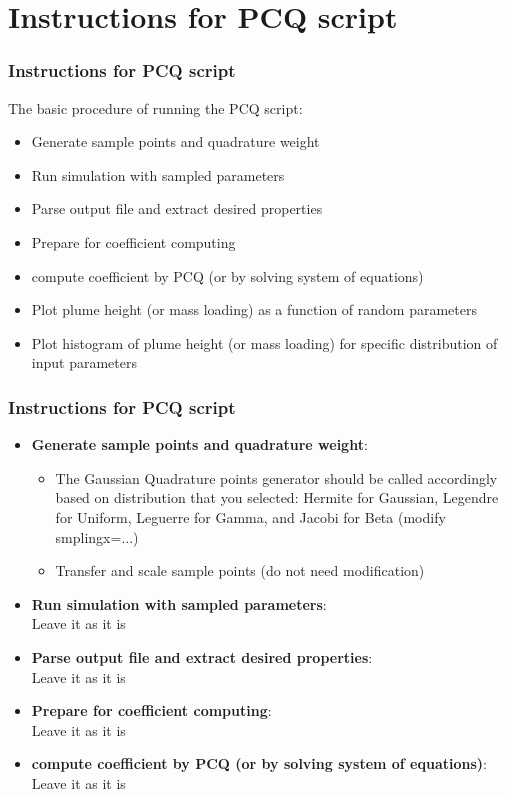 \documentclass[10pt]{beamer}
\begin{document}
\section{Instructions for PCQ script}
\begin{frame}
\frametitle{Instructions for PCQ script}
The basic procedure of running the PCQ script:
 \begin{itemize}
 \item Generate sample points and quadrature weight
 \item Run simulation with sampled parameters
 \item Parse output file and extract desired properties
 \item Prepare for coefficient computing
 \item compute coefficient by PCQ (or by solving system of equations)
 \item Plot plume height (or mass loading) as a function of random parameters
 \item Plot histogram of plume height (or mass loading) for specific distribution of input parameters
 \end{itemize}
\end{frame}
\begin{frame}
\frametitle{Instructions for PCQ script}
\begin{itemize}  
 \item {\bf Generate sample points and quadrature weight}:\\
   \begin{itemize}
    \item The Gaussian Quadrature points generator should be called accordingly based on distribution that you selected:
    Hermite for Gaussian, Legendre for Uniform, Leguerre for Gamma, and Jacobi for Beta (modify smplingx=...)
    \item Transfer and scale sample points (do not need modification)
    \end{itemize}
 \item {\bf Run simulation with sampled parameters}:\\
 Leave it as it is
 \item {\bf Parse output file and extract desired properties}:\\
 Leave it as it is
 \item {\bf Prepare for coefficient computing}:\\
 Leave it as it is
 \item {\bf compute coefficient by PCQ (or by solving system of equations)}:\\
 Leave it as it is    
\end{itemize}
\end{frame}
\end{document}
